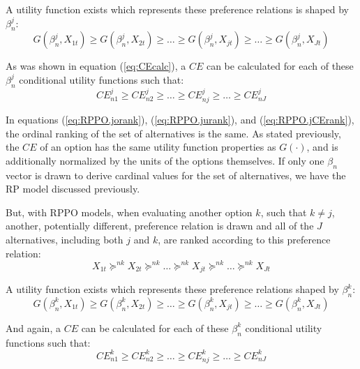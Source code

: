 \documentclass[11pt,a4paper]{article}
\newcommand\CE{\ensuremath{\mathit{CE}}}  %
\begin{document}
\noindent A utility function exists which represents these preference relations is shaped by $\beta_n^j$:
\begin{equation}
	\label{eq:RPPO.jurank}
	G(\beta_n^j,X_{1t}) \geq G(\beta_n^j,X_{2t}) \geq \ldots \geq G(\beta_n^j,X_{jt}) \geq \ldots \geq G(\beta_n^j,X_{Jt})
\end{equation}

As was shown in equation (\ref{eq:CEcalc}), a {\CE} can be calculated for each of these $\beta_n^j$ conditional utility functions such that:
\begin{equation}
	\label{eq:RPPO.jCErank}
	{\CE}^j_{n1} \geq {\CE}^j_{n2} \geq \ldots \geq {\CE}^j_{nj} \geq \ldots \geq {\CE}^j_{nJ}
\end{equation}

In equations (\ref{eq:RPPO.jorank}), (\ref{eq:RPPO.jurank}), and (\ref{eq:RPPO.jCErank}), the ordinal ranking of the set of alternatives is the same.
As stated previously, the {\CE} of an option has the same utility function properties as $G(\cdot)$, and is additionally normalized by the units of the options themselves.
If only one $\beta_n$ vector is drawn to derive cardinal values for the set of alternatives, we have the RP model discussed previously.

But, with RPPO models, when evaluating another option $k$, such that $k \neq j$, another, potentially different, preference relation is drawn and all of the $J$ alternatives, including both $j$ and $k$, are ranked according to this preference relation:
\begin{equation}
	\label{eq:RPPO.korank}
	X_{1t} \succcurlyeq^{nk} X_{2t} \succcurlyeq^{nk} \ldots \succcurlyeq^{nk} X_{jt} \succcurlyeq^{nk} \ldots \succcurlyeq^{nk} X_{Jt}
\end{equation}

\noindent A utility function exists which represents these preference relations shaped by $\beta_n^k$:
\begin{equation}
	\label{eq:RPPO.kurank}
	G(\beta_n^k,X_{1t}) \geq G(\beta_n^k,X_{2t}) \geq \ldots \geq G(\beta_n^k,X_{jt}) \geq \ldots \geq G(\beta_n^k,X_{Jt})
\end{equation}

\noindent And again, a {\CE} can be calculated for each of these $\beta_n^k$ conditional utility functions such that:
\begin{equation}
	\label{eq:RPPO.kCErank}
	{\CE}^k_{n1} \geq {\CE}^k_{n2} \geq \ldots \geq {\CE}^k_{nj} \geq \ldots \geq {\CE}^k_{nJ}
\end{equation}
\end{document}
